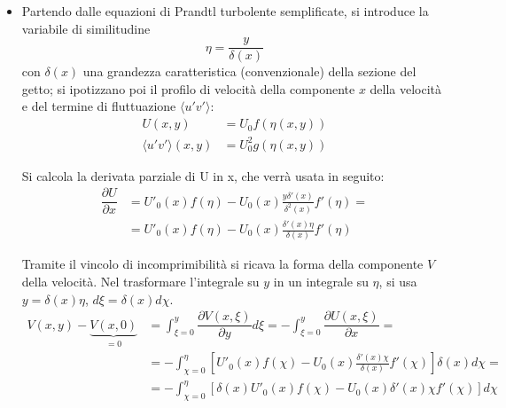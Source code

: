 \begin{itemize}
\item Partendo dalle equazioni di Prandtl turbolente semplificate, si
 introduce la variabile di similitudine
\begin{equation}
  \eta = \dfrac{y}{\delta(x)}
\end{equation}
 con $\delta(x)$ una grandezza caratteristica (convenzionale) della 
 sezione del getto; 
 si  ipotizzano poi il profilo di velocità della componente $x$ della
 velocità e del termine di fluttuazione $\langle u'v' \rangle$:
\begin{equation}
\begin{aligned}
 U(x,y) & = U_0 f(\eta(x,y)) \\
 \langle u'v' \rangle (x,y) & = U^2_0 g(\eta(x,y))
\end{aligned}
\end{equation}

 Si calcola la derivata parziale di U in x, che verrà usata in seguito:
\begin{equation}
\begin{aligned}
 \dfrac{\partial U}{\partial x} & =  U'_0 (x) f(\eta)
 - U_0(x) \frac{y \delta'(x)}{\delta^2(x)} f'(\eta) = \\
 & =  U'_0 (x) f(\eta)
 - U_0(x) \frac{ \delta'(x) \eta}{\delta(x)} f'(\eta)
\end{aligned}
\end{equation}

Tramite il vincolo di incomprimibilità si ricava la forma della 
 componente $V$ della velocità. Nel trasformare l'integrale su $y$
 in un integrale su $\eta$, si usa $y = \delta(x) \eta$,
 $d\xi = \delta(x) d\chi$.
\begin{equation}
\begin{aligned}
 V(x,y) - \underbrace{V(x,0) }_{=0} & =
 \int_{\xi=0}^y \dfrac{\partial V(x,\xi)}{\partial y} d\xi = 
 -\int_{\xi=0}^y \dfrac{\partial U(x,\xi)}{\partial x}  = \\
 & = -\int_{\chi=0}^\eta \left[ U'_0 (x) f(\chi)
 - U_0(x) \frac{ \delta'(x) \chi}{\delta(x)} f'(\chi) \right]
  \delta(x) d \chi = \\
 & = -\int_{\chi=0}^\eta \left[ \delta(x) U'_0 (x) f(\chi)
 - U_0(x) \delta'(x) \chi f'(\chi) \right]
   d \chi
\end{aligned}
\end{equation}


\end{itemize}

